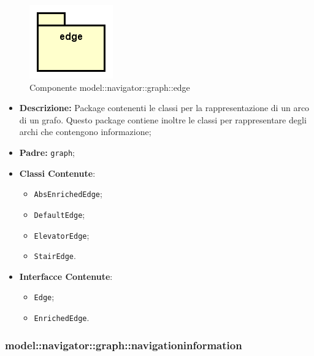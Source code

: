 \documentclass[../DefinizioneDiProdotto.tex]{subfiles}
\begin{document}
\begin{figure}[H]
	\centering
	\includegraphics[width=\maxwidth]{img/package/edge.png}
	\caption{Componente model::\-navigator::\-graph::\-edge}\label{fig:model::navigator::graph::edge} 
\end{figure}
\begin{itemize}
	\item \textbf{Descrizione:} Package contenenti le classi per la rappresentazione di un arco di un grafo. Questo package contiene inoltre le classi per rappresentare degli archi che contengono informazione;
	\item \textbf{Padre:} \texttt{graph};
	\item \textbf{Classi Contenute}:
	\begin{itemize}
		\item \texttt{AbsEnrichedEdge};
		
		\item \texttt{DefaultEdge};
		
		\item \texttt{ElevatorEdge};
		
		\item \texttt{StairEdge}.
		
	\end{itemize}
	\item \textbf{Interfacce Contenute}:
	\begin{itemize}
		\item \texttt{Edge};
		
		\item \texttt{EnrichedEdge}.
		
	\end{itemize}
\end{itemize}

\subsubsection{model::\-navigator::\-graph::\-navigationinformation}
\end{document}
